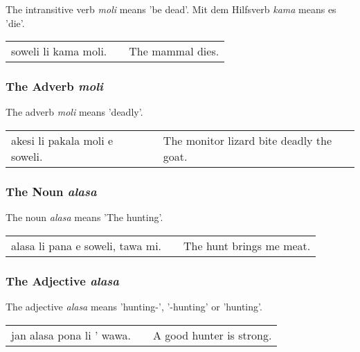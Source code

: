 The intransitive verb \textit{moli} means 'be dead'.
Mit dem Hilfsverb \textit{kama} means es 'die'. 

\begin{supertabular}{p{5,5cm}|ll}
soweli li kama moli. && The mammal dies. \\
\end{supertabular} 

%
%
\subsubsection*{The Adverb \textit{moli}}
%
%
The adverb \textit{moli} means 'deadly'. 

\begin{supertabular}{p{5,5cm}|ll}
akesi li pakala moli e soweli. && The monitor lizard bite deadly the goat. \\
\end{supertabular} 

%
%
\subsubsection*{The Noun \textit{alasa}}
%

The noun \textit{alasa} means 'The hunting'.

\begin{supertabular}{p{5,5cm}|ll}
alasa li pana e soweli, tawa mi. && The hunt brings me meat.\\
\end{supertabular}

%
\subsubsection*{The Adjective \textit{alasa}}
%

The adjective \textit{alasa} means 'hunting-', '-hunting' or 'hunting'.

\begin{supertabular}{p{5,5cm}|ll}
jan alasa pona li ' wawa. && A good hunter is strong. \\
\end{supertabular}

